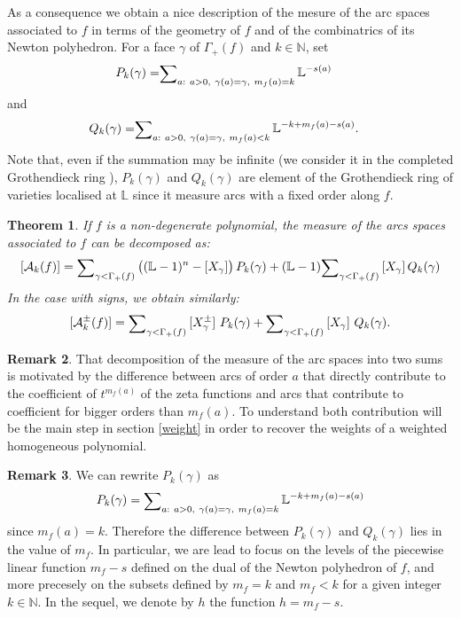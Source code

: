 \documentclass[12pt,a4paper,leqno]{amsart}
\newtheorem{thm}{Theorem}[section]
\theoremstyle{definition}
\newtheorem{rem}[thm]{Remark}
\begin{document}
As a consequence we obtain a nice description of the mesure of the arc
spaces associated to $f$ in terms of the geometry of $f$ and of the
combinatrics of its Newton polyhedron. For a face $\gamma$ of $\Gamma_+(f)$ and $k \in \mathbb N$, set
\begin{align*}
P_k(\gamma)=&
{\mathop{\textrm{\scriptsize $\mathop\sum$}}}_{a:\ a>0,~\gamma(a)=\gamma,\ m_f(a)=k}\,{\mathbb{L}}^{-s(a)}
\end{align*}
and
\begin{align*}
Q_k(\gamma)=&
{\mathop{\textrm{\scriptsize $\mathop\sum$}}}_{a:\ a>0,~\gamma(a)=\gamma,\ m_f(a)<k}\,{\mathbb{L}}^{-k+m_f(a)-s(a)}.
\end{align*}
Note that, even if the summation may be infinite (we consider it in the
completed Grothendieck ring \cite{DL}), $P_k(\gamma)$ and $Q_k(\gamma)$ are element of the
Grothendieck ring of varieties localised at ${\mathbb{L}}$ since it measure
arcs with a fixed order along $f$.

\begin{thm}\label{Thm1}
If $f$ is a non-degenerate polynomial, the measure of the arcs spaces
associated to $f$ can be decomposed as:
$$[\mathcal A_k(f)]
=
{\mathop{\textrm{\scriptsize $\mathop\sum$}}}_{\gamma < \Gamma_+(f)}\,\bigl(({\mathbb{L}}-1)^{n}-[X_{\gamma}]\bigr)\,P_k(\gamma)
+({\mathbb{L}}-1){\mathop{\textrm{\scriptsize $\mathop\sum$}}}_{\gamma < \Gamma_+(f)}\,[X_{\gamma}]\,Q_k(\gamma)$$
In the case with signs, we obtain similarly:
$$[\mathcal A_k^\pm(f)]
={\mathop{\textrm{\scriptsize $\mathop\sum$}}}_{\gamma < \Gamma_+(f)}\,[X_\gamma^\pm]\ P_k(\gamma)
+{\mathop{\textrm{\scriptsize $\mathop\sum$}}}_{\gamma < \Gamma_+(f)}\,[X_\gamma]\ Q_k(\gamma).$$
\end{thm}

\begin{rem}
That decomposition of the measure of the arc spaces into two
sums is motivated by the difference between arcs of order $a$ that
directly contribute to the coefficient of $t^{m_f(a)}$ of the zeta
  functions and arcs that contribute to coefficient for bigger orders
  than $m_f(a)$. To understand both contribution will be the main step
  in section \ref{weight} in order to recover the weights of a weighted
  homogeneous polynomial.
\end{rem}

\begin{rem}\label{levelh} We can rewrite $P_k(\gamma)$ as
$$P_k(\gamma)={\mathop{\textrm{\scriptsize $\mathop\sum$}}}_{a:\ a>0,~\gamma(a)=\gamma,\ m_f(a)=k}\,{\mathbb{L}}^{-k+m_f(a)-s(a)}$$
since $m_f(a)=k$. Therefore the difference between $P_k(\gamma)$ and
$Q_k(\gamma)$ lies in the value of $m_f$.
In particular, we are lead to focus on the levels of
the piecewise linear function $m_f-s$ defined on the dual of the
Newton polyhedron of $f$, and more precesely on the subsets defined by
$m_f=k$ and $m_f<k$ for a given integer $k\in \mathbb N$. In the
sequel, we denote by
$h$ the function $h=m_f-s$.
\end{rem}
\end{document}
